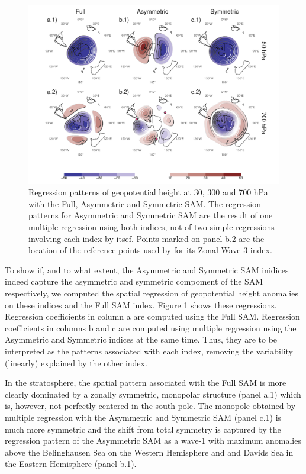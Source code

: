 \documentclass[]{ametsocV5}
\begin{document}
\begin{figure}
\includegraphics{2d-regr-1} \caption[Regression patterns of geopotential height at 30, 300 and 700 hPa with the Full, Asymmetric and Symmetric SAM]{Regression patterns of geopotential height at 30, 300 and 700 hPa with the Full, Asymmetric and Symmetric SAM. The regression patterns for Asymmetric and Symmetric SAM are the result of one multiple regression using both indices, not of two simple regressions involving each index by itsef. Points marked on panel b.2 are the location of the reference points used by \cite{raphael2004} for its Zonal Wave 3 index.}\label{fig:2d-regr}
\end{figure}

To show if, and to what extent, the Asymmetric and Symmetric SAM
inidices indeed capture the asymmetric and symmetric compoment of the
SAM respectively, we computed the spatial regression of geopotential
height anomalies on these indices and the Full SAM index. Figure
\ref{fig:2d-regr} shows these regressions. Regression coefficients in
column a are computed using the Full SAM. Regression coefficients in
columns b and c are computed using multiple regression using the
Asymmetric and Symmetric indices at the same time. Thus, they are to be
interpreted as the patterns associated with each index, removing the
variability (linearly) explained by the other index.

In the stratosphere, the spatial pattern associated with the Full SAM is
more clearly dominated by a zonally symmetric, monopolar structure
(panel a.1) which is, however, not perfectly centered in the south pole.
The monopole obtained by multiple regression with the Asymmetric and
Symmetric SAM (panel c.1) is much more symmetric and the shift from
total symmetry is captured by the regression pattern of the Asymmetric
SAM as a wave-1 with maximum anomalies above the Belinghausen Sea on the
Western Hemisphere and and Davids Sea in the Eastern Hemisphere (panel
b.1).
\end{document}
